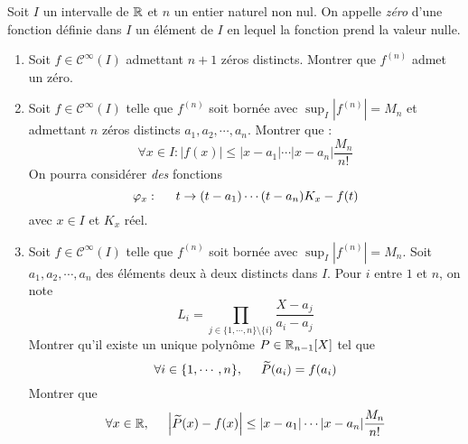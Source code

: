 Soit $I$ un intervalle de $\mathbb{R}$ et $n$ un entier naturel non nul. On appelle \emph{zéro} d'une fonction définie dans $I$ un élément de $I$ en lequel la fonction prend la valeur nulle.
\begin{enumerate}
 \item Soit $f \in \mathcal C^{\infty}(I)$ admettant $n+1$ zéros distincts. Montrer que $f^{(n)}$ admet un zéro.
\item Soit $f\in \mathcal C^\infty(I)$ telle que $f^{(n)}$ soit bornée avec $\sup_{I}|f^{(n)}| = M_n$ et admettant $n$ zéros distincts $a_1, a_2, \cdots, a_n$. Montrer que :
\begin{displaymath}
 \forall x \in I : |f(x)| \leq |x-a_1|\cdots|x-a_n|\frac{M_n}{n!}
\end{displaymath}
On pourra considérer \emph{des} fonctions
\begin{displaymath}
\varphi_x:\hspace{0.5cm} t\rightarrow (t-a_1)\cdots(t-a_n)K_x -f(t)
\end{displaymath}
avec $x\in I$ et $K_x$ réel.
\item Soit $f\in \mathcal C^\infty(I)$  telle que $f^{(n)}$ soit bornée avec $\sup_{I}|f^{(n)}| = M_n$. Soit $a_1, a_2, \cdots, a_n$ des éléments deux à deux distincts dans $I$. Pour $i$ entre $1$ et $n$, on note
\begin{displaymath}
 L_i = \prod_{j\in\{1,\cdots,n\}\setminus\{i\}}\frac{X-a_j}{a_i-a_j}
\end{displaymath}
Montrer qu'il existe un unique polynôme $P\in \mathbb{R}_{n-1}[X]$ tel que
\begin{displaymath}
 \forall i\in\{1,\cdots,n\},\hspace{0.5cm}\widetilde{P}(a_i)=f(a_i)
\end{displaymath}
Montrer que
\begin{displaymath}
 \forall x\in \mathbb{R}, \hspace{0.5cm}\left| \widetilde{P}(x)-f(x)\right| \leq |x-a_1|\cdots|x-a_n|\frac{M_n}{n!}
\end{displaymath}

\end{enumerate}
